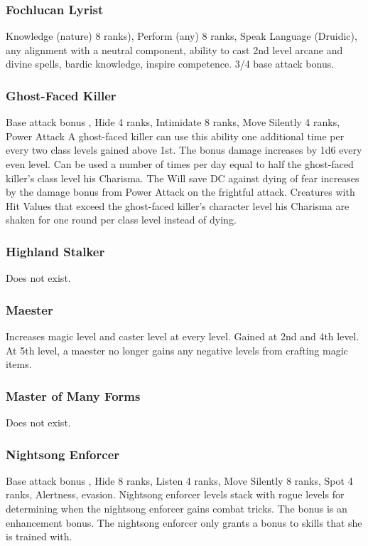 \subsubsection{Fochlucan Lyrist}
 Knowledge (nature) 8 ranks), Perform (any) 8 ranks, Speak Language (Druidic), any alignment with a neutral component, ability to cast 2nd level arcane and divine spells, bardic knowledge, inspire competence.
 3/4 base attack bonus.
\subsubsection{Ghost-Faced Killer}
 Base attack bonus , Hide 4 ranks, Intimidate 8 ranks, Move Silently 4 ranks, Power Attack
 A ghost-faced killer can use this ability one additional time per every two class levels gained above 1st.
 The bonus damage increases by 1d6 every even level.
 Can be used a number of times per day equal to half the ghost-faced killer's class level \add his Charisma. The Will save DC against dying of fear increases by the damage bonus from Power Attack on the frightful attack. Creatures with Hit Values that exceed the ghost-faced killer's character level \add his Charisma are shaken for one round per class level instead of dying.
\subsubsection{Highland Stalker}
Does not exist.
\subsubsection{Maester}
 Increases magic level and caster level at every level.
 Gained at 2nd and 4th level.
 At 5th level, a maester no longer gains any negative levels from crafting magic items.
\subsubsection{Master of Many Forms}
Does not exist.
\subsubsection{Nightsong Enforcer}
 Base attack bonus , Hide 8 ranks, Listen 4 ranks, Move Silently 8 ranks, Spot 4 ranks, Alertness, evasion.
 Nightsong enforcer levels stack with rogue levels for determining when the nightsong enforcer gains combat tricks.
 The bonus is an enhancement bonus. The nightsong enforcer only grants a bonus to skills that she is trained with.

